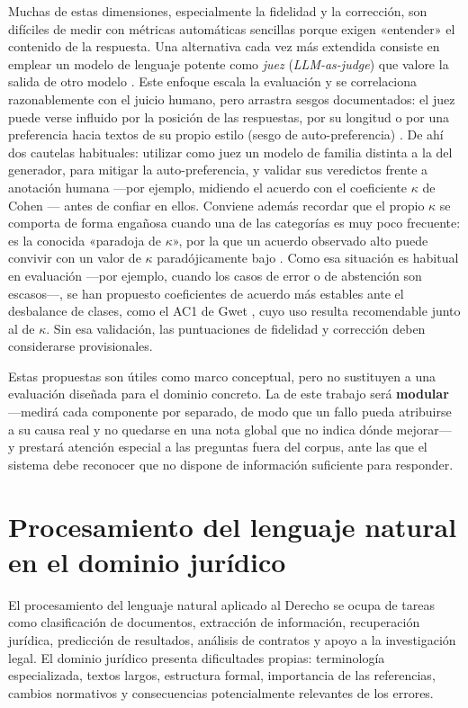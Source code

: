 Muchas de estas dimensiones, especialmente la fidelidad y la corrección, son difíciles de medir con métricas automáticas sencillas porque exigen «entender» el contenido de la respuesta. Una alternativa cada vez más extendida consiste en emplear un modelo de lenguaje potente como \emph{juez} (\emph{LLM-as-judge}) que valore la salida de otro modelo \cite{zheng2023judge}. Este enfoque escala la evaluación y se correlaciona razonablemente con el juicio humano, pero arrastra sesgos documentados: el juez puede verse influido por la posición de las respuestas, por su longitud o por una preferencia hacia textos de su propio estilo (sesgo de auto-preferencia) \cite{zheng2023judge}. De ahí dos cautelas habituales: utilizar como juez un modelo de familia distinta a la del generador, para mitigar la auto-preferencia, y validar sus veredictos frente a anotación humana —por ejemplo, midiendo el acuerdo con el coeficiente $\kappa$ de Cohen \cite{cohen1960kappa}— antes de confiar en ellos. Conviene además recordar que el propio $\kappa$ se comporta de forma engañosa cuando una de las categorías es muy poco frecuente: es la conocida «paradoja de $\kappa$», por la que un acuerdo observado alto puede convivir con un valor de $\kappa$ paradójicamente bajo \cite{feinstein1990paradox}. Como esa situación es habitual en evaluación —por ejemplo, cuando los casos de error o de abstención son escasos—, se han propuesto coeficientes de acuerdo más estables ante el desbalance de clases, como el AC1 de Gwet \cite{gwet2008ac1}, cuyo uso resulta recomendable junto al de $\kappa$. Sin esa validación, las puntuaciones de fidelidad y corrección deben considerarse provisionales.

Estas propuestas son útiles como marco conceptual, pero no sustituyen a una evaluación diseñada para el dominio concreto. La de este trabajo será \textbf{modular} —medirá cada componente por separado, de modo que un fallo pueda atribuirse a su causa real y no quedarse en una nota global que no indica dónde mejorar— y prestará atención especial a las preguntas fuera del corpus, ante las que el sistema debe reconocer que no dispone de información suficiente para responder.

\section{Procesamiento del lenguaje natural en el dominio jurídico}
\label{sec:nlp-juridico}

El procesamiento del lenguaje natural aplicado al Derecho se ocupa de tareas como clasificación de documentos, extracción de información, recuperación jurídica, predicción de resultados, análisis de contratos y apoyo a la investigación legal. El dominio jurídico presenta dificultades propias: terminología especializada, textos largos, estructura formal, importancia de las referencias, cambios normativos y consecuencias potencialmente relevantes de los errores.

